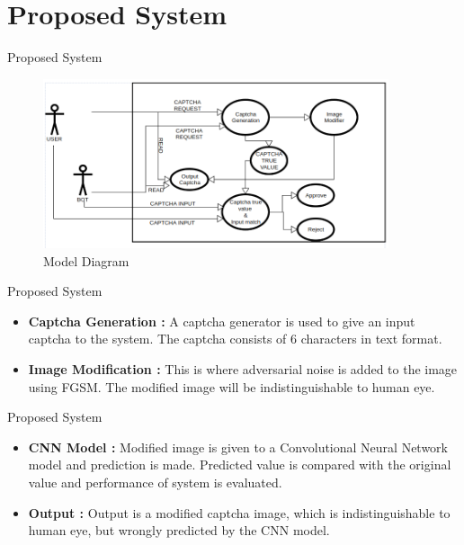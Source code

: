 \documentclass[10pt]{beamer}
\begin{document}
\section{Proposed System}
\begin{frame}{Proposed System}
\begin{figure}
    \centering
    \includegraphics[width=4in]{UML2-PROJECT.png}
    \caption{Model Diagram}
\end{figure}
\end{frame}
\begin{frame}{Proposed System}
\begin{itemize}
    \item \textbf{Captcha Generation :} A captcha generator is used to  give an input captcha to the system. The captcha consists of 6 characters in text format.
    \item \textbf{Image Modification :} This is where adversarial noise is added to the image using FGSM. The modified image will be indistinguishable to human eye.
    
\end{itemize}

\end{frame}

\begin{frame}{Proposed System}
    \begin{itemize}
    \item \textbf{CNN Model :} Modified image is given to a Convolutional Neural Network model and prediction is made.
Predicted value is compared with the original value and
performance of system is evaluated.
        \item \textbf{Output : }Output is a modified captcha image, which is indistinguishable to
human eye, but wrongly predicted by the CNN model.

    \end{itemize}
\end{frame}
\end{document}
